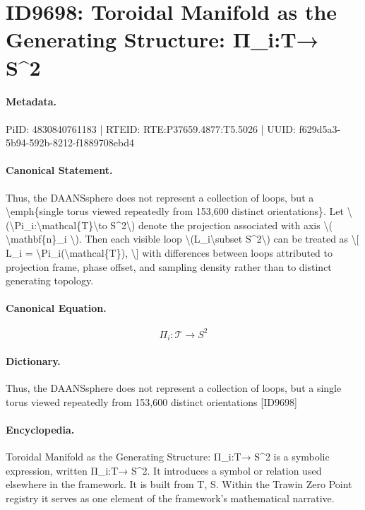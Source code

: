 \section*{ID9698: Toroidal Manifold as the Generating Structure: Π\_i:T→ S\textasciicircum{}2}
\paragraph{Metadata.}
PiID: 4830840761183 | RTEID: RTE:P37659.4877:T5.5026 | UUID: f629d5a3-5b94-592b-8212-f1889708ebd4

\paragraph{Canonical Statement.}
Thus, the DAANSsphere does not represent a collection of loops, but a \textbackslash{}emph\{single torus viewed repeatedly from 153,600 distinct orientations\}. Let \textbackslash{}(\textbackslash{}Pi\_i:\textbackslash{}mathcal\{T\}\textbackslash{}to S\textasciicircum{}2\textbackslash{}) denote the projection associated with axis \textbackslash{}( \textbackslash{}mathbf\{n\}\_i \textbackslash{}). Then each visible loop \textbackslash{}(L\_i\textbackslash{}subset S\textasciicircum{}2\textbackslash{}) can be treated as \textbackslash{}[ L\_i = \textbackslash{}Pi\_i(\textbackslash{}mathcal\{T\}), \textbackslash{}] with differences between loops attributed to projection frame, phase offset, and sampling density rather than to distinct generating topology.

\paragraph{Canonical Equation.}
\[
\Pi_i:\mathcal{T}\to S^2
\]

\paragraph{Dictionary.}
Thus, the DAANSsphere does not represent a collection of loops, but a single torus viewed repeatedly from 153,600 distinct orientations [ID9698]

\paragraph{Encyclopedia.}
Toroidal Manifold as the Generating Structure: Π\_i:T→ S\textasciicircum{}2 is a symbolic expression, written Π\_i:T→ S\textasciicircum{}2. It introduces a symbol or relation used elsewhere in the framework. It is built from T, S. Within the Trawin Zero Point registry it serves as one element of the framework's mathematical narrative.
